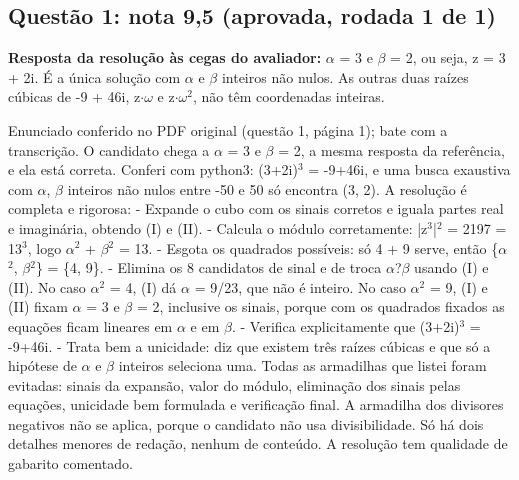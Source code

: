\documentclass{article}%
\begin{document}
\subsection*{Questão 1: nota 9,5 (aprovada, rodada 1 de 1)}%
\textbf{Resposta da resolução às cegas do avaliador:} $\alpha$ = 3 e $\beta$ = 2, ou seja, z = 3 + 2i. É a única solução com $\alpha$ e $\beta$ inteiros não nulos. As outras duas raízes cúbicas de -9 + 46i, z$\cdot$$\omega$ e z$\cdot$$\omega$$^2$, não têm coordenadas inteiras.\par %
Enunciado conferido no PDF original (questão 1, página 1); bate com a transcrição. O candidato chega a $\alpha$ = 3 e $\beta$ = 2, a mesma resposta da referência, e ela está correta. Conferi com python3: (3+2i)$^3$ = -9+46i, e uma busca exaustiva com $\alpha$, $\beta$ inteiros não nulos entre -50 e 50 só encontra (3, 2).\newline%
\newline%
A resolução é completa e rigorosa:\newline%
{-} Expande o cubo com os sinais corretos e iguala partes real e imaginária, obtendo (I) e (II).\newline%
{-} Calcula o módulo corretamente: |z$^3$|$^2$ = 2197 = 13$^3$, logo $\alpha$$^2$ + $\beta$$^2$ = 13.\newline%
{-} Esgota os quadrados possíveis: só 4 + 9 serve, então \{$\alpha$$^2$, $\beta$$^2$\} = \{4, 9\}.\newline%
{-} Elimina os 8 candidatos de sinal e de troca $\alpha$?$\beta$ usando (I) e (II). No caso $\alpha$$^2$ = 4, (I) dá $\alpha$ = 9/23, que não é inteiro. No caso $\alpha$$^2$ = 9, (I) e (II) fixam $\alpha$ = 3 e $\beta$ = 2, inclusive os sinais, porque com os quadrados fixados as equações ficam lineares em $\alpha$ e em $\beta$.\newline%
{-} Verifica explicitamente que (3+2i)$^3$ = -9+46i.\newline%
{-} Trata bem a unicidade: diz que existem três raízes cúbicas e que só a hipótese de $\alpha$ e $\beta$ inteiros seleciona uma.\newline%
\newline%
Todas as armadilhas que listei foram evitadas: sinais da expansão, valor do módulo, eliminação dos sinais pelas equações, unicidade bem formulada e verificação final. A armadilha dos divisores negativos não se aplica, porque o candidato não usa divisibilidade.\newline%
\newline%
Só há dois detalhes menores de redação, nenhum de conteúdo. A resolução tem qualidade de gabarito comentado.%
$$
\end{document}
